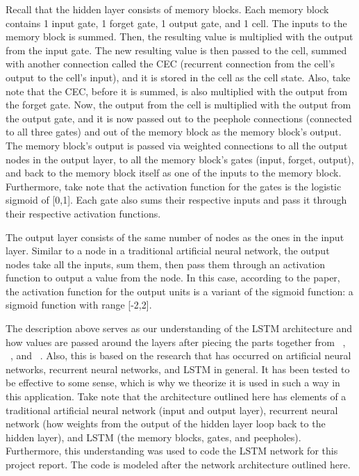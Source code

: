 \documentclass[11pt,letterpaper]{article}
\begin{document}
Recall that the hidden layer consists of memory blocks. Each memory block contains 1 input gate, 1 forget gate, 1 output gate, and 1 cell. The inputs to the memory block is summed. Then, the resulting value is multiplied with the output from the input gate. The new resulting value is then passed to the cell, summed with another connection called the CEC (recurrent connection from the cell's output to the cell's input), and it is stored in the cell as the cell state. Also, take note that the CEC, before it is summed, is also multiplied with the output from the forget gate. Now, the output from the cell is multiplied with the output from the output gate, and it is now passed out to the peephole connections (connected to all three gates) and out of the memory block as the memory block's output. The memory block's output is passed via weighted connections to all the output nodes in the output layer, to all the memory block's gates (input, forget, output), and back to the memory block itself as one of the inputs to the memory block. Furthermore, take note that the activation function for the gates is the logistic sigmoid of [0,1]. Each gate also sums their respective inputs and pass it through their respective activation functions. 

The output layer consists of the same number of nodes as the ones in the input layer. Similar to a node in a traditional artificial neural network, the output nodes take all the inputs, sum them, then pass them through an activation function to output a value from the node. In this case, according to the paper, the activation function for the output units is a variant of the sigmoid function: a sigmoid function with range [-2,2]. 

The description above serves as our understanding of the LSTM architecture and how values are passed around the layers after piecing the parts together from ~\cite{Gers:99}, ~\cite{Gers:01}, and ~\cite{Gers:02}. Also, this is based on the research that has occurred on artificial neural networks, recurrent neural networks, and LSTM in general. It has been tested to be effective to some sense, which is why we theorize it is used in such a way in this application. Take note that the architecture outlined here has elements of a traditional artificial neural network (input and output layer), recurrent neural network (how weights from the output of the hidden layer loop back to the hidden layer), and LSTM (the memory blocks, gates, and peepholes). Furthermore, this understanding was used to code the LSTM network for this project report. The code is modeled after the network architecture outlined here.
\end{document}
